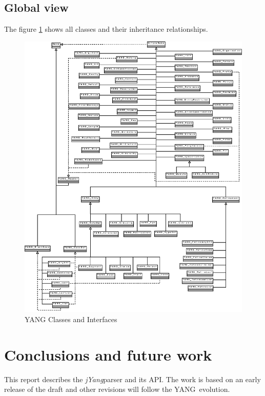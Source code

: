 \documentclass[a4paper]{article}
\newcommand{\jyang}{{\sl jYang}}
\newcommand{\y}{YANG}
\begin{document}
\subsection{Global view}

The  figure  \ref{global}  shows  all classes  and  their  inheritance
relationships.

\begin{figure}[htbp]
\begin{center}
\includegraphics[scale = 1]{SimpleNodeHierarchy.eps}
\end{center}
\caption{YANG Classes and Interfaces}
\label{global}
\end{figure}

\section{Conclusions and future work}

This report describes the \jyang parser and its API. The work is based
on an early release of the draft\cite{yang01} and other revisions will
follow the \y\ evolution.
\end{document}
